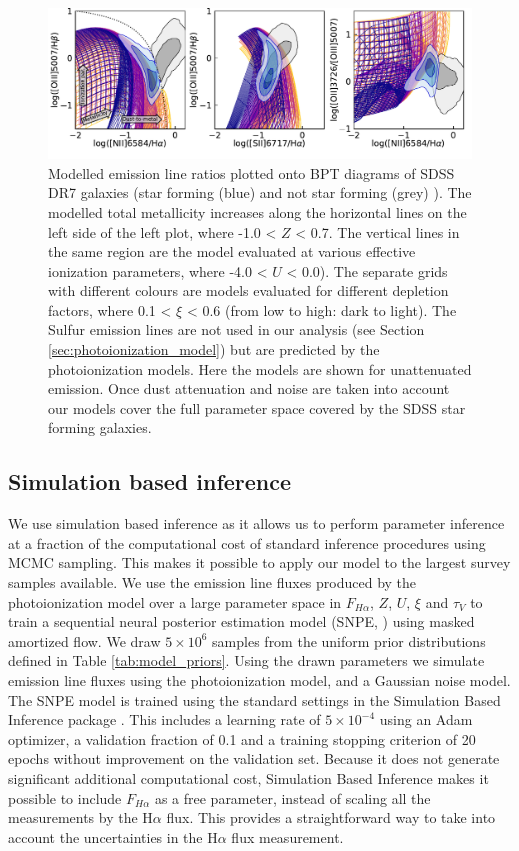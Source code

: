 \documentclass[fleqn,usenatbib]{mnras}
\begin{document}
\begin{figure}
    \centering
    \includegraphics[width=\textwidth]{figures/fig1.pdf}
    \caption{Modelled emission line ratios plotted onto BPT diagrams of SDSS DR7 galaxies (star forming (blue) and not star forming (grey) \citep{kauffmann2003}). The modelled total metallicity increases along the horizontal lines on the left side of the left plot, where -1.0 < $Z$ < 0.7. The vertical lines in the same region are the model evaluated at various effective ionization parameters, where -4.0 < $U$ < 0.0). The separate grids with different colours are models evaluated for different depletion factors, where 0.1 < $\xi$ < 0.6 (from low to high: dark to light). The Sulfur emission lines are not used in our analysis (see Section \ref{sec:photoionization_model}) but are predicted by the photoionization models. Here the models are shown for unattenuated emission. Once dust attenuation and noise are taken into account our models cover the full parameter space covered by the SDSS star forming galaxies.}
    \label{fig:photoionization_model_BPT}
\end{figure}

\subsection{Simulation based inference}
We use simulation based inference as it allows us to perform parameter inference at a fraction of the computational cost of standard inference procedures using MCMC sampling. This makes it possible to apply our model to the largest survey samples available. We use the emission line fluxes produced by the photoionization model over a large parameter space in $F_{H\alpha}$, $Z$, $U$, $\xi$ and $\tau_V$ to train a sequential neural posterior estimation model (SNPE, \cite{greenberg2019}) using masked amortized flow.  We draw $5\times10^6$ samples from the uniform prior distributions defined in Table \ref{tab:model_priors}. Using the drawn parameters we simulate emission line fluxes using the photoionization model, and a Gaussian noise model. The SNPE model is trained using the standard settings in the Simulation Based Inference package \citep{tejero-cantero2020}. This includes a learning rate of $5 \times 10^{-4}$ using an Adam optimizer, a validation fraction of 0.1 and a training stopping criterion of 20 epochs without improvement on the validation set. Because it does not generate significant additional computational cost, Simulation Based Inference makes it possible to include $F_{H\alpha}$ as a free parameter, instead of scaling all the measurements by the H$\alpha$ flux. This provides a straightforward way to take into account the uncertainties in the H$\alpha$ flux measurement. 
\end{document}
